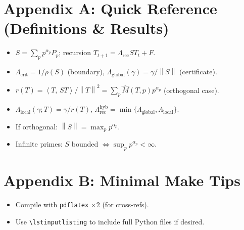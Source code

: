 \documentclass[11pt]{article}
\newcommand{\Mhat}{\widehat{M}}
\newcommand{\Lrec}{\Lambda_{\mathrm{rec}}}
\newcommand{\Lglobal}{\Lambda_{\mathrm{global}}}
\newcommand{\Llocal}{\Lambda_{\mathrm{local}}}
\newcommand{\Lcrit}{\Lambda_{\mathrm{crit}}}
\newcommand{\Lhyb}{\Lambda_{\mathrm{rec}}^{\mathrm{hyb}}}
\newcommand{\PGprojector}{P}
\newcommand{\norm}[1]{\left\lVert #1\right\rVert}
\newcommand{\ip}[2]{\left\langle #1,\,#2\right\rangle}
\theoremstyle{definition}
\begin{document}
\section*{Appendix A: Quick Reference (Definitions \& Results)}
\begin{itemize}[leftmargin=*,nosep]
  \item $S=\sum_p p^{\alpha_p}\PGprojector_p$; recursion $T_{t+1}=\Lrec ST_t+F$.
  \item $\Lcrit=1/\rho(S)$ (boundary), $\Lglobal(\gamma)=\gamma/\norm{S}$ (certificate).
  \item $r(T)=\ip{T}{ST}/\norm{T}^2=\sum_p \Mhat(T,p)p^{\alpha_p}$ (orthogonal case).
  \item $\Llocal(\gamma;T)=\gamma/r(T)$, $\Lhyb=\min\{\Lglobal,\Llocal\}$.
  \item If orthogonal: $\norm{S}=\max_p p^{\alpha_p}$.
  \item Infinite primes: $S$ bounded $\Leftrightarrow \sup_p p^{\alpha_p}<\infty$.
\end{itemize}

\section*{Appendix B: Minimal Make Tips}
\begin{itemize}[leftmargin=*,nosep]
  \item Compile with \texttt{pdflatex} $\times$2 (for cross-refs).
  \item Use \texttt{\textbackslash lstinputlisting} to include full Python files if desired.
\end{itemize}

\nocite{*}


\end{document}
